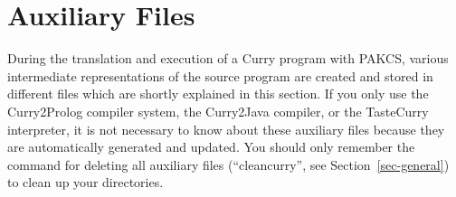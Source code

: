 \documentclass[11pt,fleqn]{article}
\renewcommand{\tt}{\usefont{OT1}{cmtt}{m}{n}\selectfont}
\newcommand{\codefont}{\tt}
\newcommand{\ccode}[1]{``\mbox{\codefont #1}''}
\begin{document}
\newpage

\section{Auxiliary Files}
\label{sec-auxfiles}

During the translation and execution of a Curry program with PAKCS,
various intermediate representations of the source program are created
and stored in different files which are shortly explained in this section.
If you only use the Curry2Prolog compiler system, the Curry2Java compiler,
or the TasteCurry interpreter, it is not necessary to know about
these auxiliary files because they are automatically generated
and updated. You should only remember the command for deleting
all auxiliary files (\ccode{cleancurry}, see Section~\ref{sec-general})
to clean up your directories.
\end{document}
